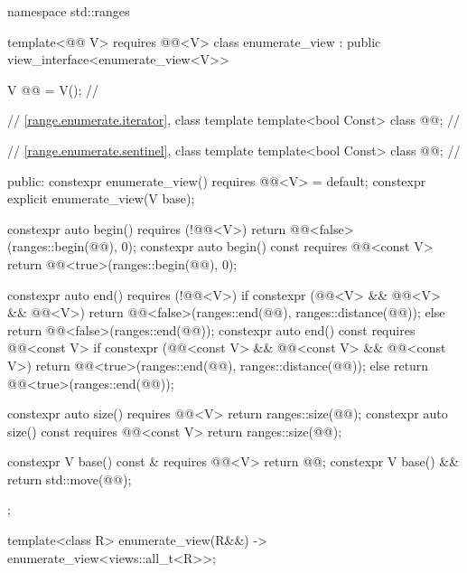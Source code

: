 %
%
%
\begin{codeblock}
namespace std::ranges {
  template<@@ V>
    requires @@<V>
  class enumerate_view : public view_interface<enumerate_view<V>> {
    V @@ = V();                                    // \expos

    // \ref{range.enumerate.iterator}, class template 
    template<bool Const>
      class @@;                                 // \expos

    // \ref{range.enumerate.sentinel}, class template 
    template<bool Const>
      class @@;                                 // \expos

  public:
    constexpr enumerate_view() requires @@<V> = default;
    constexpr explicit enumerate_view(V base);

    constexpr auto begin() requires (!@@<V>)
    { return @@<false>(ranges::begin(@@), 0); }
    constexpr auto begin() const requires @@<const V>
    { return @@<true>(ranges::begin(@@), 0); }

    constexpr auto end() requires (!@@<V>) {
      if constexpr (@@<V> && @@<V> && @@<V>)
        return @@<false>(ranges::end(@@), ranges::distance(@@));
      else
        return @@<false>(ranges::end(@@));
    }
    constexpr auto end() const requires @@<const V> {
      if constexpr (@@<const V> && @@<const V> && @@<const V>)
        return @@<true>(ranges::end(@@), ranges::distance(@@));
      else
        return @@<true>(ranges::end(@@));
    }

    constexpr auto size() requires @@<V>
    { return ranges::size(@@); }
    constexpr auto size() const requires @@<const V>
    { return ranges::size(@@); }

    constexpr V base() const & requires @@<V> { return @@; }
    constexpr V base() && { return std::move(@@); }
  };

  template<class R>
    enumerate_view(R&&) -> enumerate_view<views::all_t<R>>;
}
\end{codeblock}

